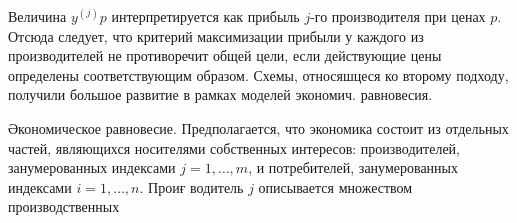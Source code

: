 \documentclass[10pt]{article}
\begin{document}
Величина $y^{(j)} p$ интерпретируется как прибыль $j$-го производителя при ценах $p$. Отсюда следует, что критерий максимизации прибыли у каждого из производителей не противоречит общей цели, если действующие цены определены соответствующим образом. Схемы, относяшцеся ко второму подходу, получили большое развитие в рамках моделей экономич. равновесия.



Әкономическое равновесие. Предполагается, что экономика состоит из отдельных частей, являющихся носителями собственных интересов: производителей, занумерованных индексами $j=1, \ldots, m$, и потребителей, занумерованных индексами $i=1, \ldots, n$. Проиғ водитель $j$ описывается множеством производственных
\end{document}
